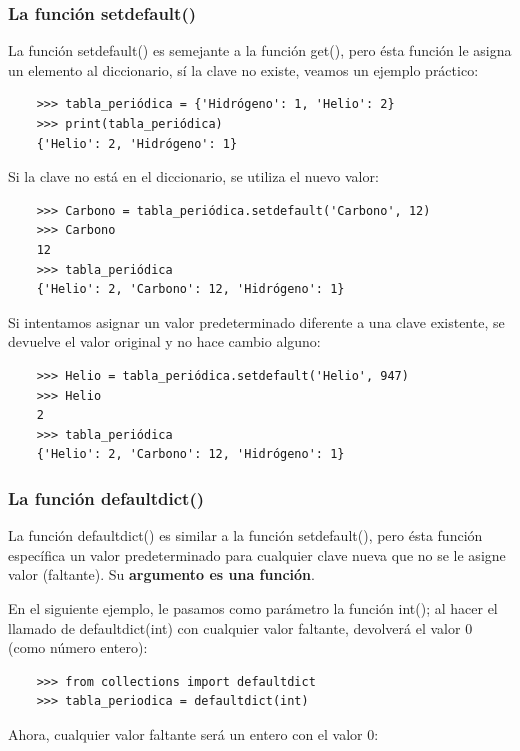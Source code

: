\subsubsection{La función  setdefault()}

La función {\ttfamily setdefault()} es semejante a la función {\ttfamily get()}, pero ésta función le asigna un elemento al diccionario, sí
la clave no existe, veamos un ejemplo práctico:

\begin{lstlisting}
	>>> tabla_periódica = {'Hidrógeno': 1, 'Helio': 2}
	>>> print(tabla_periódica)
	{'Helio': 2, 'Hidrógeno': 1}
\end{lstlisting}

Si la clave no está en el diccionario, se utiliza el nuevo valor:

\begin{lstlisting}
	>>> Carbono = tabla_periódica.setdefault('Carbono', 12)
	>>> Carbono
	12
	>>> tabla_periódica
	{'Helio': 2, 'Carbono': 12, 'Hidrógeno': 1}
\end{lstlisting}

Si intentamos asignar un valor predeterminado diferente a una clave existente, se devuelve el valor original
y no hace cambio alguno:

\begin{lstlisting}
	>>> Helio = tabla_periódica.setdefault('Helio', 947)
	>>> Helio
	2
	>>> tabla_periódica
	{'Helio': 2, 'Carbono': 12, 'Hidrógeno': 1}
\end{lstlisting}


\subsubsection{La función defaultdict()}

La función {\ttfamily defaultdict()} es similar a la función {\ttfamily setdefault()}, pero ésta función específica un valor predeterminado para cualquier clave nueva que no se le asigne valor (faltante). Su {\bf argumento es una función}. 

En el siguiente ejemplo, le pasamos como parámetro la función {\ttfamily int()}; al hacer el llamado de {\ttfamily defaultdict(int)} con cualquier valor faltante,   devolverá  el valor 0 (como número entero):

\begin{lstlisting}
	>>> from collections import defaultdict
	>>> tabla_periodica = defaultdict(int)
\end{lstlisting}
Ahora, cualquier valor faltante será un entero con el valor 0:

